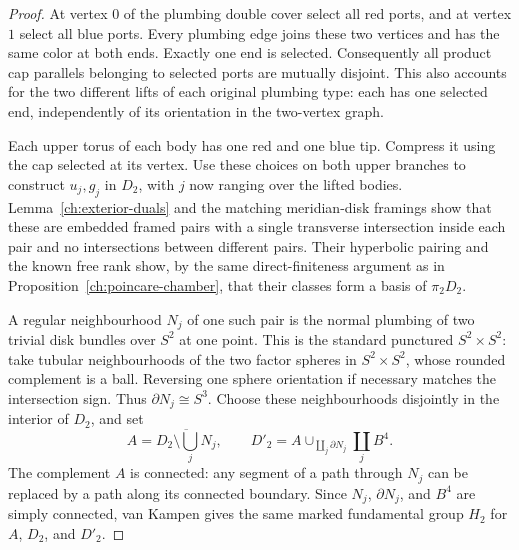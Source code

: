 \begin{proof}
At vertex $0$ of the plumbing double cover select all red
ports, and at vertex $1$ select all blue ports.  Every
plumbing edge joins these two vertices and has the same
color at both ends.  Exactly one end is selected.
Consequently all product cap parallels belonging to
selected ports are mutually disjoint.  This also accounts
for the two different lifts of each original plumbing
type: each has one selected end, independently of its
orientation in the two-vertex graph.

Each upper torus of each body has one red and one blue
tip.  Compress it using the cap selected at its vertex.
Use these choices on both upper branches to construct
$u_j,g_j$ in $D_2$, with $j$ now ranging over the lifted
bodies.  Lemma~\ref{ch:exterior-duals} and the matching
meridian-disk framings show that these are embedded framed
pairs with a single transverse intersection inside each
pair and no intersections between different pairs.
Their hyperbolic pairing and the known free rank show,
by the same direct-finiteness argument as in
Proposition~\ref{ch:poincare-chamber}, that their classes
form a basis of $\pi_2D_2$.

A regular neighbourhood $N_j$ of one such pair is the
normal plumbing of two trivial disk bundles over $S^2$
at one point.  This is the standard punctured
$S^2\times S^2$: take tubular neighbourhoods of the two
factor spheres in $S^2\times S^2$, whose rounded
complement is a ball.  Reversing one sphere orientation
if necessary matches the intersection sign.  Thus
$\partial N_j\cong S^3$.  Choose these neighbourhoods
disjointly in the interior of $D_2$, and set
\[
 A=\overline{D_2\setminus\bigcup_jN_j},\qquad
 D'_2=A\cup_{\coprod_j\partial N_j}\coprod_jB^4.
\]
The complement $A$ is connected: any segment of a path
through $N_j$ can be replaced by a path along its connected
boundary.  Since $N_j$, $\partial N_j$, and $B^4$ are
simply connected, van Kampen gives the same marked
fundamental group $H_2$ for $A$, $D_2$, and $D'_2$.


\end{proof}
